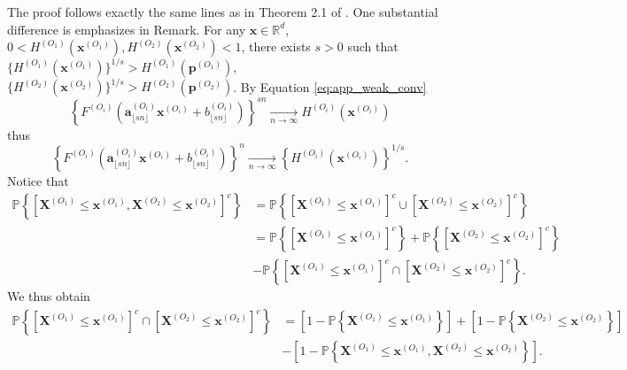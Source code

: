 \documentclass[11pt]{article}
\makeatletter
\theoremstyle{definition}
\renewenvironment{proof}[1][\proofname]{\par
\pushQED{\qed}%
\normalfont \topsep6\p@\@plus6\p@\relax
\trivlist
\item\relax
{\textbf{
#1\@addpunct{ }}}\hspace\labelsep\ignorespaces
}{%
\popQED\endtrivlist\@endpefalse
}
\makeatother
\begin{document}
	\begin{proof}
		The proof follows exactly the same lines as in Theorem 2.1 of \cite{takahashi1994asymptotic}. One substantial difference is emphasizes in Remark. 
		For any $\textbf{x} \in \mathbb{R}^d$, $0 < H^{(O_1)}(\textbf{x}^{(O_1)}), H^{(O_2)}(\textbf{x}^{(O_2)}) < 1$, there exists $s > 0$ such that $\{ H^{(O_1)}(\textbf{x}^{(O_1)}) \}^{1/s} > H^{(O_1)}(\textbf{p}^{(O_1)})$, $\{ H^{(O_2)}(\textbf{x}^{(O_2)}) \}^{1/s} > H^{(O_2)}(\textbf{p}^{(O_2)})$. By Equation \eqref{eq:app_weak_conv}
		\begin{equation*}
			\left\{ F^{(O_i)}\left(\textbf{a}_{\lfloor sn \rfloor}^{(O_i)} \textbf{x}^{(O_i)} + b_{\lfloor sn \rfloor}^{(O_i)} \right) \right\}^{sn} \underset{n \rightarrow \infty}{\longrightarrow} H^{(O_i)}(\textbf{x}^{(O_i)})
		\end{equation*}
		thus
		\begin{equation*}
			\left\{ F^{(O_i)}\left(\textbf{a}_{\lfloor sn \rfloor}^{(O_i)} \textbf{x}^{(O_i)} + b_{\lfloor sn \rfloor}^{(O_i)} \right) \right\}^{n} \underset{n \rightarrow \infty}{\longrightarrow} \left\{ H^{(O_i)}(\textbf{x}^{(O_i)}) \right\}^{1/s}.
		\end{equation*}
		Notice that
		\begin{align*}
			\mathbb{P}\left\{ \left[ \textbf{X}^{(O_1)} \leq \textbf{x}^{(O_1)}, \textbf{X}^{(O_2)} \leq \textbf{x}^{(O_2)} \right]^c \right\} &= \mathbb{P} \left\{ \left[\textbf{X}^{(O_1)} \leq \textbf{x}^{(O_1)} \right]^c \cup \left[\textbf{X}^{(O_2)} \leq \textbf{x}^{(O_2)} \right]^c \right\} \\
			&= \mathbb{P} \left\{ \left[\textbf{X}^{(O_1)} \leq \textbf{x}^{(O_1)} \right]^c \right\} + \mathbb{P} \left\{ \left[\textbf{X}^{(O_2)} \leq \textbf{x}^{(O_2)} \right]^c \right\} \\
			&- \mathbb{P} \left\{ \left[\textbf{X}^{(O_1)} \leq \textbf{x}^{(O_1)} \right]^c \cap \left[\textbf{X}^{(O_2)} \leq \textbf{x}^{(O_2)} \right]^c \right\}.
		\end{align*}
		We thus obtain 
		\begin{align*}
		\mathbb{P} \left\{ \left[\textbf{X}^{(O_1)} \leq \textbf{x}^{(O_1)} \right]^c \cap \left[\textbf{X}^{(O_2)} \leq \textbf{x}^{(O_2)} \right]^c \right\} & = \left[ 1-\mathbb{P} \left\{ \textbf{X}^{(O_1)} \leq \textbf{x}^{(O_1)} \right\} \right] + \left[ 1 - \mathbb{P} \left\{ \textbf{X}^{(O_2)} \leq \textbf{x}^{(O_2)} \right\} \right] \\ &- \left[ 1- \mathbb{P}\left\{ \textbf{X}^{(O_1)} \leq \textbf{x}^{(O_1)}, \textbf{X}^{(O_2)} \leq \textbf{x}^{(O_2)} \right\} \right].

\end{align*}
\end{proof}
\end{document}
